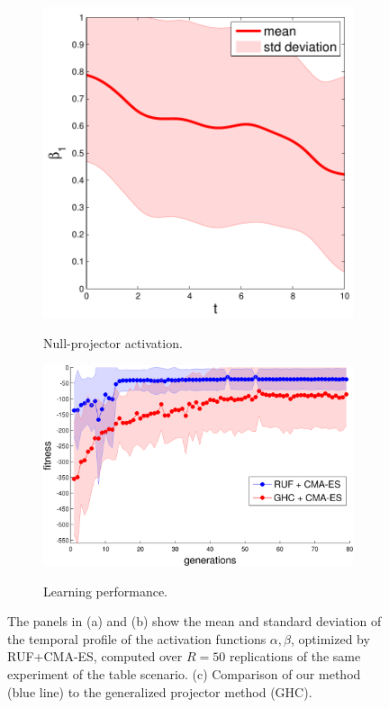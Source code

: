 \begin{figure}
\begin{subfigure}{.3\textwidth}
  \includegraphics[width=1\linewidth]{./sections/WP4/pics_serena/alpha2}
  \label{fig:alpha2}
  \caption{Null-projector activation.}
\end{subfigure}
\begin{subfigure}{.38\textwidth}
  \centering
  \includegraphics[width=1\linewidth]{./sections/WP4/pics_serena/comparison}
  \label{fig:alpha3}
  \caption{Learning performance.}
\end{subfigure}
\caption{The panels in (a) and (b) show the mean and standard deviation of the temporal
profile of the activation functions $\alpha,\beta$, optimized by RUF+CMA-ES,
computed over $R=50$ replications of the same experiment of the table scenario.
(c) Comparison of our method (blue line) to the generalized projector method (GHC).}
\label{fig:activation_policy}
\end{figure}

